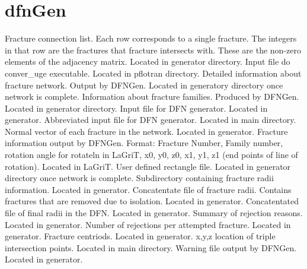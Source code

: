 \documentclass[letterpaper,10pt,english]{sphinxmanual}
\begin{document}
\section{dfnGen}
\label{output:id1}\label{output:connectivity-dat}
Fracture connection list. Each row corresponds to a single fracture. The integers in that row are the fractures that fracture intersects with. These are the non-zero elements of the adjacency matrix. Located in generator directory.
\label{output:convert-uge-params-txt}
Input file do conver\_uge executable. Located in pflotran directory.
\label{output:dfn-output-txt}
Detailed information about fracture network. Output by DFNGen.  Located in generatory directory once network is complete.
\label{output:families-dat}
Information about fracture families. Produced by DFNGen. Located in generator directory.
\label{output:input-generator-dat}
Input file for DFN generator. Located in generator.
\label{output:input-generator-clean-dat}
Abbreviated input file for DFN generator. Located in main directory.
\label{output:normal-vectors-dat}
Normal vector of each fracture in the network. Located in generator.
\label{output:poly-info-dat}
Fracture information output by DFNGen. Format: Fracture Number, Family number, rotation angle for rotateln in LaGriT, x0, y0, z0, x1, y1, z1 (end points of line of rotation). Located in LaGriT.
\label{output:user-rects-dat}
User defined rectangle file. Located in generator directory once network is complete.
\label{output:radii}
Subdirectory containing fracture radii information. Located in generator.
\label{output:radii-dat}
Concatentate file of fracture radii. Contains fractures that are removed due to isolation.  Located in generator.
\label{output:radii-final-dat}
Concatentated file of final radii in the DFN. Located in generator.
\label{output:rejections-dat}
Summary of rejection reasons. Located in generator.
\label{output:rejectsperattempt-dat}
Number of rejections per attempted fracture. Located in generator.
\label{output:translations-dat}
Fracture centriods. Located in generator.
\label{output:triple-points-dat}
x,y,z location of triple intersection points. Located in main directory.
\label{output:warningfiledfngen-txt}
Warning file output by DFNGen. Located in generator.
\end{document}
